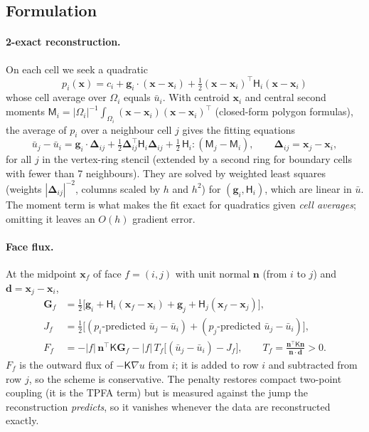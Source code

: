 \documentclass[11pt]{article}
\numberwithin{equation}{section}
\theoremstyle{remark}
\begin{document}
\subsection{Formulation}

\paragraph{2-exact reconstruction.}  On each cell we seek a quadratic
\begin{equation}
  p_i(\bm x)=c_i+\bm g_i\cdot(\bm x-\bm x_i)+\tfrac12(\bm x-\bm x_i)^{\!\top}\mathsf H_i(\bm x-\bm x_i)
\end{equation}
whose cell average over $\Omega_i$ equals $\bar u_i$.  With centroid $\bm x_i$
and central second moments
$\mathsf M_i=|\Omega_i|^{-1}\int_{\Omega_i}(\bm x-\bm x_i)(\bm x-\bm x_i)^{\!\top}$
(closed-form polygon formulas), the average of $p_i$ over a neighbour cell $j$ gives
the fitting equations
\begin{equation}
  \bar u_j-\bar u_i = \bm g_i\cdot\bm\Delta_{ij}+\tfrac12\bm\Delta_{ij}^{\!\top}\mathsf H_i\bm\Delta_{ij}
  +\tfrac12\,\mathsf H_i:(\mathsf M_j-\mathsf M_i),\qquad \bm\Delta_{ij}=\bm x_j-\bm x_i,
  \label{eq:fit}
\end{equation}
for all $j$ in the vertex-ring stencil (extended by a second ring for
boundary cells with fewer than 7 neighbours).  They are solved by weighted
least squares (weights $|\bm\Delta_{ij}|^{-2}$, columns scaled by $h$ and $h^2$) for
$(\bm g_i,\mathsf H_i)$, which are linear in $\bar u$.  The moment term is what
makes the fit exact for quadratics given \emph{cell averages}; omitting it
leaves an $O(h)$ gradient error.

\paragraph{Face flux.}  At the midpoint $\bm x_f$ of face $f=(i,j)$ with unit
normal $\bm n$ (from $i$ to $j$) and $\bm d=\bm x_j-\bm x_i$,
\begin{align}
  \bm G_f &= \tfrac12\big[\bm g_i+\mathsf H_i(\bm x_f-\bm x_i)+\bm g_j+\mathsf H_j(\bm x_f-\bm x_j)\big],\\
  J_f &= \tfrac12\big[(p_i\text{-predicted }\bar u_j-\bar u_i)+(p_j\text{-predicted }\bar u_j-\bar u_i)\big],\\
  F_f &= -|f|\,\bm n^{\!\top}\mathsf K\bm G_f-|f|\,T_f\big[(\bar u_j-\bar u_i)-J_f\big],
  \qquad T_f=\frac{\bm n^{\!\top}\mathsf K\bm n}{\bm n\cdot\bm d}>0 .
  \label{eq:qflux}
\end{align}
$F_f$ is the outward flux of $-\mathsf K\nabla u$ from $i$; it is added to
row $i$ and subtracted from row $j$, so the scheme is conservative.  The
penalty restores compact two-point coupling (it is the TPFA term) but is
measured against the jump the reconstruction \emph{predicts}, so it vanishes
whenever the data are reconstructed exactly.
\end{document}
